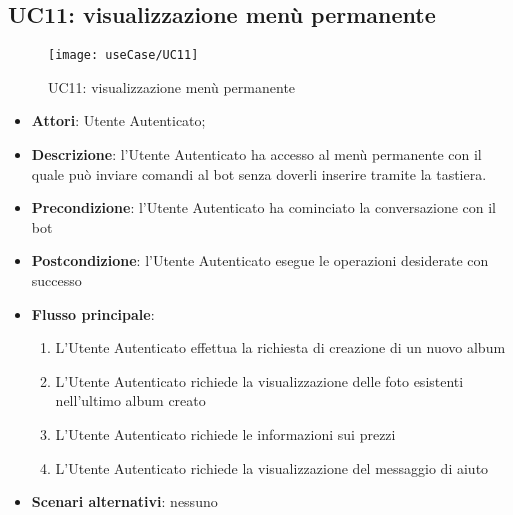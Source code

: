 %



\newpage

\subsection{UC11: visualizzazione menù permanente}
\label{uc:uc11}

\begin{figure}[H]
  \centering
  \texttt{[image: useCase/UC11]}
  \caption{UC11: visualizzazione menù permanente}
\end{figure}

\begin{itemize}
  \item \textbf{Attori}: Utente Autenticato;
  \item \textbf{Descrizione}: l'Utente Autenticato ha accesso al menù
permanente con il quale può inviare comandi al bot senza doverli inserire
tramite la tastiera.
  \item \textbf{Precondizione}: l'Utente Autenticato ha cominciato la
conversazione con il bot
  \item \textbf{Postcondizione}: l'Utente Autenticato esegue le operazioni
desiderate con successo
  \item \textbf{Flusso principale}:
  \begin{enumerate}
    \item L'Utente Autenticato effettua la richiesta di creazione di un nuovo
album
    \item L'Utente Autenticato richiede la visualizzazione delle foto esistenti
nell'ultimo album creato
    \item L'Utente Autenticato richiede le informazioni sui prezzi
    \item L'Utente Autenticato richiede la visualizzazione del messaggio di
aiuto
  \end{enumerate}
  \item \textbf{Scenari alternativi}: nessuno
\end{itemize}


